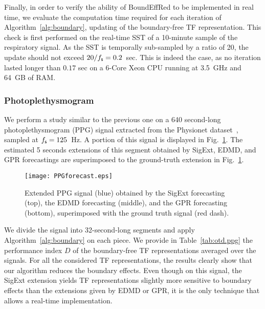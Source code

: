 Finally, in order to verify the ability of {\sf BoundEffRed} to be implemented in real time, we evaluate the computation time required for each iteration of Algorithm~\ref{alg:boundary}, updating of the boundary-free TF representation. This check is first performed on the real-time SST of a 10-minute sample of the respiratory signal. As the SST is temporally sub-sampled by a ratio of 20, the update should not exceed $20/f_{\mathsf s}=0.2$~sec. This is indeed the case, as no iteration lasted longer than $0.17$ sec on a 6-Core Xeon CPU running at 3.5~GHz and 64~GB of RAM.

\subsubsection{Photoplethysmogram}
\label{ssse:ppg}
We perform a study similar to the previous one on a 640 second-long photoplethysmogram (PPG) signal extracted from the Physionet dataset~\cite{Pimentel17toward, Goldberger00physiobank}, sampled at $f_{\mathsf s}=125$~Hz. A portion of this signal is displayed in Fig.~\ref{fig:ppg}. The estimated 5 seconds extensions of this segment obtained by {\sf SigExt}, EDMD, and GPR forecastings  are superimposed to the ground-truth extension in Fig.~\ref{fig:ppg}.

\begin{figure}
\texttt{[image: PPGforecast.eps]}
\caption{Extended PPG signal (blue) obtained by the {\sf SigExt} forecasting (top), the EDMD forecasting (middle), and the GPR forecasting (bottom), superimposed with the ground truth signal (red dash).}
\label{fig:ppg}
\end{figure}

We divide the signal into 32-second-long segments and apply Algorithm~\ref{alg:boundary} on each piece. We provide in Table~\ref{tab:otd.ppg} the performance index $D$ of the boundary-free TF representations averaged over the signals. For all the considered TF representations, the results clearly show that our algorithm reduces the boundary effects. Even though on this signal, the {\sf SigExt} extension yields TF representations slightly more sensitive to boundary effects than the extensions given by EDMD or GPR, it is the only technique that allows a real-time implementation.

